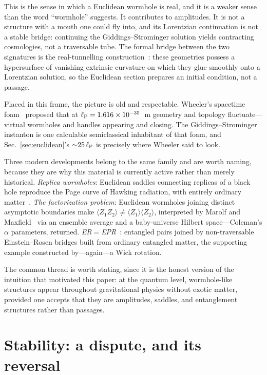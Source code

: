 \documentclass[twocolumn,floatfix,aps,prd,nofootinbib]{revtex4-2}
\begin{document}
This is the sense in which a Euclidean wormhole is real, and it is a weaker sense than the word ``wormhole'' suggests. It contributes to amplitudes. It is not a structure with a mouth one could fly into, and its Lorentzian continuation is not a stable bridge: continuing the Giddings--Strominger solution yields contracting cosmologies, not a traversable tube. The formal bridge between the two signatures is the real-tunnelling construction~\cite{gibbons1990}: these geometries possess a hypersurface of vanishing extrinsic curvature on which they glue smoothly onto a Lorentzian solution, so the Euclidean section prepares an initial condition, not a passage.

Placed in this frame, the picture is old and respectable. Wheeler's spacetime foam~\cite{wheeler1957} proposed that at $\ell_{\rm P}=1.616\times10^{-35}$~m geometry and topology fluctuate---virtual wormholes and handles appearing and closing. The Giddings--Strominger instanton is one calculable semiclassical inhabitant of that foam, and Sec.~\ref{sec:euclidean}'s ${\sim}25\,\ell_{\rm P}$ is precisely where Wheeler said to look.

Three modern developments belong to the same family and are worth naming, because they are why this material is currently active rather than merely historical. \emph{Replica wormholes}: Euclidean saddles connecting replicas of a black hole reproduce the Page curve of Hawking radiation, with entirely ordinary matter~\cite{penington2020,almheiri2020}. \emph{The factorization problem}: Euclidean wormholes joining distinct asymptotic boundaries make $\langle Z_1Z_2\rangle\neq\langle Z_1\rangle\langle Z_2\rangle$, interpreted by Marolf and Maxfield~\cite{marolf2020} via an ensemble average and a baby-universe Hilbert space---Coleman's $\alpha$ parameters, returned. \emph{ER${}={}$EPR}~\cite{maldacena2013}: entangled pairs joined by non-traversable Einstein--Rosen bridges built from ordinary entangled matter, the supporting example constructed by---again---a Wick rotation.

The common thread is worth stating, since it is the honest version of the intuition that motivated this paper: at the quantum level, wormhole-like structures appear throughout gravitational physics without exotic matter, provided one accepts that they are amplitudes, saddles, and entanglement structures rather than passages.

\section{Stability: a dispute, and its reversal}
\label{sec:stability}
\end{document}
